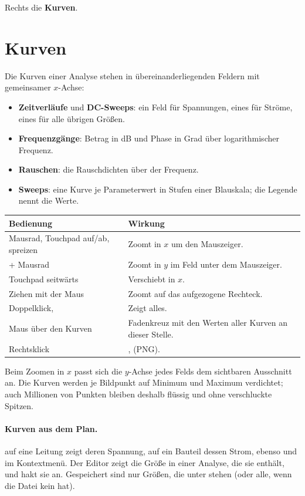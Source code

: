 Rechts die \textbf{Kurven}.

\section{Kurven}

Die Kurven einer Analyse stehen in übereinanderliegenden Feldern mit
gemeinsamer $x$-Achse:

\begin{itemize}
  \item \textbf{Zeitverläufe} und \textbf{DC-Sweeps}: ein Feld für
    Spannungen, eines für Ströme, eines für alle übrigen Größen.
  \item \textbf{Frequenzgänge}: Betrag in dB und Phase in Grad über
    logarithmischer Frequenz.
  \item \textbf{Rauschen}: die Rauschdichten über der Frequenz.
  \item \textbf{Sweeps}: eine Kurve je Parameterwert in Stufen einer
    Blauskala; die Legende nennt die Werte.
\end{itemize}

\begin{center}
\begin{tabularx}{\textwidth}{@{}P{5.2cm}L@{}}
  \toprule
  Bedienung & Wirkung \\
  \midrule
  Mausrad, Touchpad auf/ab, spreizen & Zoomt in $x$ um den Mauszeiger. \\
   + Mausrad & Zoomt in $y$ im Feld unter dem Mauszeiger. \\
  Touchpad seitwärts & Verschiebt in $x$. \\
  Ziehen mit der Maus & Zoomt auf das aufgezogene Rechteck. \\
  Doppelklick,  & Zeigt alles. \\
  Maus über den Kurven & Fadenkreuz mit den Werten aller Kurven an dieser Stelle. \\
  Rechtsklick & ,  (PNG). \\
  \bottomrule
\end{tabularx}
\end{center}

Beim Zoomen in $x$ passt sich die $y$-Achse jedes Felds dem sichtbaren
Ausschnitt an. Die Kurven werden je Bildpunkt auf Minimum und Maximum
verdichtet; auch Millionen von Punkten bleiben deshalb flüssig und ohne
verschluckte Spitzen.

\paragraph{Kurven aus dem Plan.}
 auf eine Leitung zeigt deren Spannung, auf ein Bauteil
dessen Strom, ebenso  und  im Kontextmenü. Der Editor zeigt die Größe in einer Analyse, die
sie enthält, und hakt sie an. Gespeichert sind nur Größen, die unter 
stehen (oder alle, wenn die Datei kein  hat).


